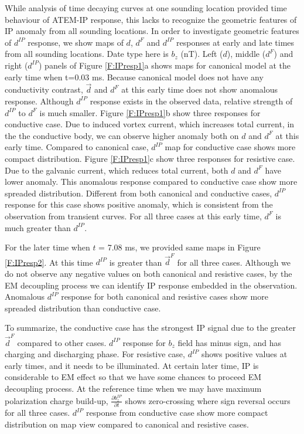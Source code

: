 \documentclass[a4paper, 11pt]{article}
\renewcommand {\d}  { {\vec d} }
\newcommand{\dip}{d^{IP}}
\begin{document}
While analysis of time decaying curves at one sounding location provided time behaviour of ATEM-IP response, this lacks to recognize the geometric features of IP anomaly from all sounding locations. In order to investigate geometric features of $\dip$ response, we show maps of $d$, $d^F$ and $\dip$ responses at early and late times from all sounding locations.  Date type here is $b_z$ (nT). Left ($d$), middle ($d^F$) and right ($\dip$) panels of Figure \ref{F:IPresp1}a shows maps for canonical model at the early time when t=0.03 ms. Because canonical model does not have any conductivity contrast, $\d$ and $d^F$ at this early time does not show anomalous response. Although $\dip$ response exists in the observed data, relative strength of $\dip$ to $d^F$ is much smaller. Figure \ref{F:IPresp1}b show three responses for conductive case. Due to  induced vortex current, which increases total current, in the the conductive body, we can observe higher anomaly both on $d$ and $d^F$ at this early time. Compared to canonical case, $\dip$ map for conductive case shows more compact distribution. Figure \ref{F:IPresp1}c show three responses for resistive case. Due to the galvanic current, which reduces total current, both $d$ and $d^{F}$ have lower anomaly. This anomalous response compared to conductive case show more spreaded distribution. Different from both canonical and conductive cases, $\dip$ response for this case shows positive anomaly, which is consistent from the observation from transient curves. For all three cases at this early time, $d^F$ is much greater than $\dip$. 

For the later time when $t$ = 7.08 ms, we provided same maps in Figure \ref{F:IPresp2}. At this time $\dip$ is greater than $\d^{F}$ for all three cases. Although we do not observe any negative values on both canonical and resistive cases, by the EM decoupling process we can identify IP response embedded in the observation. Anomalous $\dip$ response for both canonical and resistive cases show more spreaded distribution than conductive case. 

To summarize, the conductive case has the strongest IP signal due to the greater $\d^{F}$ compared to other cases. $\dip$ response for $b_z$ field has minus sign, and has charging and discharging phase. For resistive case, $\dip$ shows positive values at early times, and it needs to be illuminated. At certain later time, IP is considerable to EM effect so that we have some chances to proceed EM decoupling process. At the reference time when we may have maximum polarization charge build-up, $\frac{\partial b^{IP}_z}{\partial t}$ shows zero-crossing where sign reversal occurs for all three cases. $\dip$ response from conductive case show more compact distribution on map view compared to canonical and resistive cases. 
\end{document}
